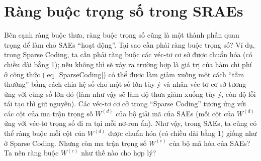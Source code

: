 \section{Ràng buộc trọng số trong SRAEs}
Bên cạnh ràng buộc thưa, ràng buộc trọng số cũng là một thành phần quan trọng để làm cho SAEs ``hoạt động''. Tại sao cần phải ràng buộc trọng số? Ví dụ, trong Sparse Coding, ta cần phải ràng buộc các véc-tơ cơ sở được chuẩn hóa (có chiều dài bằng 1); nếu không thì sẽ xảy ra trường hợp là giá trị của hàm chi phí ở công thức (\ref{eq_SparseCoding}) có thể được làm giảm xuống một cách ``tầm thường'' bằng cách chia hệ số cho một số lớn tùy ý và nhân véc-tơ cơ sở tương ứng với cùng số lớn đó (làm như vậy sẽ làm độ thưa giảm xuống tùy ý, còn độ lỗi tái tạo thì giữ nguyên). Các véc-tơ cơ cở trong ``Sparse Coding'' tương ứng với các cột của ma trận trọng số $W^{(d)}$ của bộ giải mã của SAEs (mỗi cột của $W^{(d)}$ ứng với véc-tơ trọng số đi ra tại mỗi nơ-ron ẩn). Như vậy, trong SAEs, ta cũng có thể ràng buộc mỗi cột của $W^{(d)}$ được chuẩn hóa (có chiều dài bằng 1) giống như ở Sparse Coding. Nhưng còn ma trận trọng số $W^{(e)}$ của bộ mã hóa của SAEs? Ta nên ràng buộc $W^{(e)}$ như thế nào cho hợp lý?

